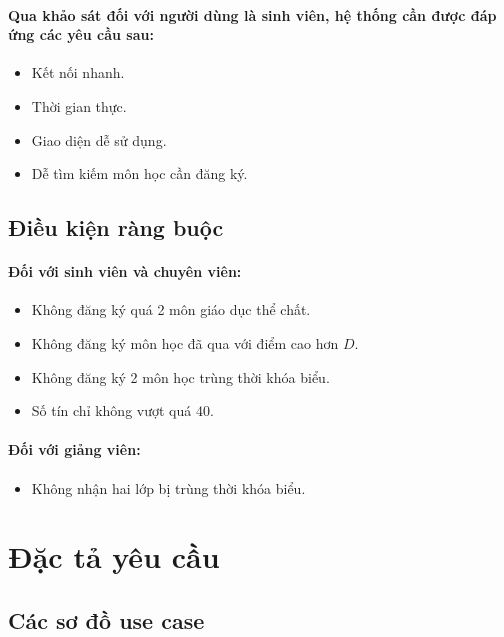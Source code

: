 \documentclass{article}
\begin{document}
    \paragraph{
      \textnormal{
        Qua khảo sát đối với người dùng là sinh viên, hệ thống cần được đáp ứng các yêu cầu sau:
      }
    }
    \begin{itemize}
      \item Kết nối nhanh.
      \item Thời gian thực.
      \item Giao diện dễ sử dụng.
      \item Dễ tìm kiếm môn học cần đăng ký.
    \end{itemize}
  
  \subsection{Điều kiện ràng buộc}
    \paragraph{Đối với sinh viên và chuyên viên:}
    \begin{itemize}
      \item Không đăng ký quá 2 môn giáo dục thể chất.
      \item Không đăng ký môn học đã qua với điểm cao hơn $ D $.
      \item Không đăng ký 2 môn học trùng thời khóa biểu.
      \item Số tín chỉ không vượt quá $ 40 $.
    \end{itemize}

    \paragraph{Đối với giảng viên:}
    \begin{itemize}
      \item Không nhận hai lớp bị trùng thời khóa biểu.
    \end{itemize}

\section{Đặc tả yêu cầu}

  \subsection{Các sơ đồ use case}
\end{document}
